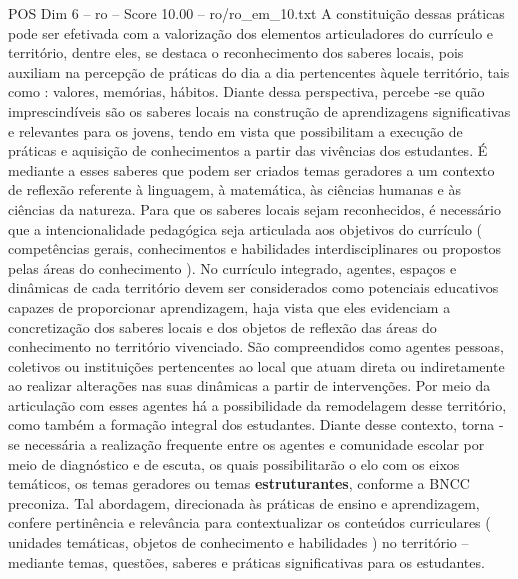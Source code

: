 \begin{textsample}{POS Dim 6 – ro – Score 10.00 – ro/ro\_em\_10.txt}
A constituição dessas práticas pode ser efetivada com a valorização dos elementos articuladores do currículo e território, dentre eles, se destaca o reconhecimento dos saberes locais, pois auxiliam na percepção de práticas do dia a dia pertencentes àquele território, tais como : valores, memórias, hábitos.
Diante dessa perspectiva, percebe -se quão imprescindíveis são os saberes locais na construção de aprendizagens significativas e relevantes para os jovens, tendo em vista que possibilitam a execução de práticas e aquisição de conhecimentos a partir das vivências dos estudantes.
É mediante a esses saberes que podem ser criados temas geradores a um contexto de reflexão referente à linguagem, à matemática, às ciências humanas e às ciências da natureza.
Para que os saberes locais sejam reconhecidos, é necessário que a intencionalidade pedagógica seja articulada aos objetivos do currículo ( competências gerais, conhecimentos e habilidades interdisciplinares ou propostos pelas áreas do conhecimento ).
No currículo integrado, agentes, espaços e dinâmicas de cada território devem ser considerados como potenciais educativos capazes de proporcionar aprendizagem, haja vista que eles evidenciam a concretização dos saberes locais e dos objetos de reflexão das áreas do conhecimento no território vivenciado.
São compreendidos como agentes pessoas, coletivos ou instituições pertencentes ao local que atuam direta ou indiretamente ao realizar alterações nas suas dinâmicas a partir de intervenções.
Por meio da articulação com esses agentes há a possibilidade da remodelagem desse território, como também a formação integral dos estudantes.
Diante desse contexto, torna -se necessária a realização frequente entre os agentes e comunidade escolar por meio de diagnóstico e de escuta, os quais possibilitarão o elo com os eixos temáticos, os temas geradores ou temas \textbf{estruturantes}, conforme a BNCC preconiza.
Tal abordagem, direcionada às práticas de ensino e aprendizagem, confere pertinência e relevância para contextualizar os conteúdos curriculares ( unidades temáticas, objetos de conhecimento e habilidades ) no território – mediante temas, questões, saberes e práticas significativas para os estudantes.

\end{textsample}
